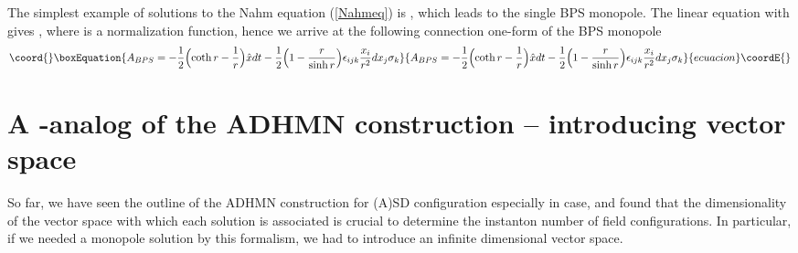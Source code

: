 \documentclass[a4paper,10pt]{article}
\providecommand{\sutwo}{\myHighlight{$SU(2)$}\coordHE{} }
\begin{document}
The simplest example of solutions to the Nahm equation (\ref{Nahmeq}) is \coordHE{} \cite{Nahm82}, which leads to the single BPS monopole.
 The linear equation \coordHE{} with \coordHE{} gives \coordHE{}, where \coordHE{} is a normalization function, hence we arrive at the following connection one-form of the BPS monopole
\begin{equation}\coord{}\boxEquation{
A_{BPS}=-\frac{1}{2}\Bigl(\coth r-\frac{1}{r}\Bigr)\hat{x}dt-\frac{1}{2}\Bigl(1-\frac{r}{\sinh r}\Bigr)\epsilon_{ijk}\frac{x_i}{r^2}dx_j\sigma_k\label{A_BPS}
}{
A_{BPS}=-\frac{1}{2}\Bigl(\coth r-\frac{1}{r}\Bigr)\hat{x}dt-\frac{1}{2}\Bigl(1-\frac{r}{\sinh r}\Bigr)\epsilon_{ijk}\frac{x_i}{r^2}dx_j\sigma_k}{ecuacion}\coordE{}\end{equation}

\section{A  \coordHE{}-analog of the ADHMN construction -- introducing \coordHE{} vector space}
So far, we have seen the outline of the ADHMN construction for (A)SD configuration especially in \sutwo case, and found that the dimensionality of the vector space \coordHE{} with which each solution is associated is crucial to determine the instanton number of field configurations.
In particular, if we needed a monopole solution by this formalism, we had to introduce an infinite dimensional vector space.
\end{document}
